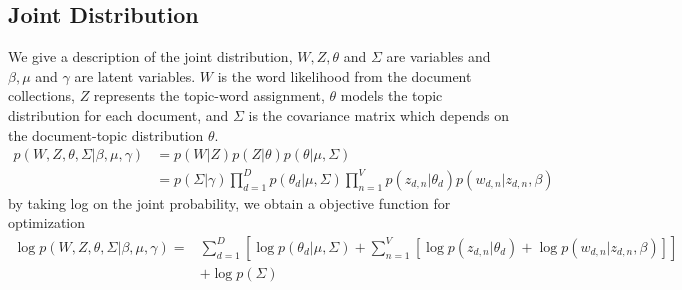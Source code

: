 \subsection{Joint Distribution}
We give a description of the joint distribution, $ W,Z,\theta $ and $ \Sigma $ are variables and $ \beta, \mu $ and $ \gamma $ are latent variables. $ W $ is the word likelihood from the document collections, $ Z $ represents the topic-word assignment, $ \theta $ models the topic distribution for each document, and $ \Sigma $ is the covariance matrix which depends on the document-topic distribution $ \theta $.
\begin{align*}
p(W,Z,\theta,\Sigma|\beta,\mu,\gamma)&=p(W|Z)p(Z|\theta)p(\theta|\mu,\Sigma)\\
&=p(\Sigma|\gamma)\prod_{d=1}^{D}p(\theta_d|\mu,\Sigma)\prod_{n=1}^{V}p(z_{d,n}|\theta_d)p(w_{d,n}|z_{d,n},\beta)
\end{align*}
by taking  log on the joint probability, we obtain a objective function for optimization
\begin{align*}
\log p(W,Z,\theta,\Sigma|\beta,\mu,\gamma)=&\sum_{d=1}^{D}\left[\log p(\theta_d|\mu,\Sigma)+\sum_{n=1}^{V}\left[\log p(z_{d,n}|\theta_d)+\log p(w_{d,n}|z_{d,n},\beta)\right]\right]\\
&+\log p(\Sigma)
\end{align*}